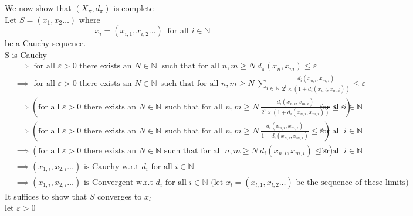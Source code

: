 \documentclass{report}
\begin{document}
We now show that $(X_\pi, d_\pi)$ is complete\\
Let $S = (x_1,x_2 \ldots )$ where $$x_i = (x_{i,1},x_{i,2}\ldots )\ \text{ for all }i \in \mathbb{N}$$
be a Cauchy sequence.\\
S is Cauchy\\
\begin{align*}
&\implies\text{ for all }\varepsilon > 0\text{ there exists an }N\in \mathbb{N}\ \text{ such that}\text{ for all }n,m \geq N\ d_\pi (x_{n}, x_{m}) \leq \varepsilon\\
&\implies\text{ for all }\varepsilon > 0\text{ there exists an }N\in \mathbb{N}\ \ \text{such that for all }n,m \geq N\ \sum_{i\in \mathbb{N}}{\frac{d_i(x_{n,i},x_{m,i})}{2^i \times (1 + d_i(x_{n,i},x_{m,i}))}} \leq \varepsilon\\
&\implies (\text{for all }\varepsilon > 0\text{ there exists an }N\in \mathbb{N}\ \ \text{such that for all }n,m \geq N\ \frac{d_i(x_{n,i},x_{m,i})}{2^i \times (1 + d_i(x_{n,i},x_{m,i}))} \leq \varepsilon)\text{ for all }i \in \mathbb{N}\\
&\implies (\text{for all }\varepsilon > 0\text{ there  exists an }N\in \mathbb{N}\ \ \text{such that for all }n,m \geq N\ \frac{d_i(x_{n,i},x_{m,i})}{1 + d_i(x_{n,i},x_{m,i})} \leq \varepsilon)\text{ for all }i \in \mathbb{N}\\
&\implies (\text{for all }\varepsilon > 0\text{ there exists an }N\in \mathbb{N}\text{ such that for all }n,m \geq N\ d_i(x_{n,i}, x_{m,i}) \leq \varepsilon)\text{ for all }i \in \mathbb{N}\\
&\implies (x_{1,i}, x_{2,i} \ldots )\text{ is Cauchy w.r.t }d_i\text{ for all }i \in \mathbb{N}\\
&\implies (x_{1,i}, x_{2,i}\ldots )\text{ is Convergent w.r.t }d_i\text{ for all }i \in \mathbb{N}\text{  (let }x_l = (x_{l,1},x_{l,2}\ldots )\text{ be the sequence of these limits)}
\end{align*}
It suffices to show that $S$ converges to $x_l$\\
let $\varepsilon > 0$\\
\end{document}
